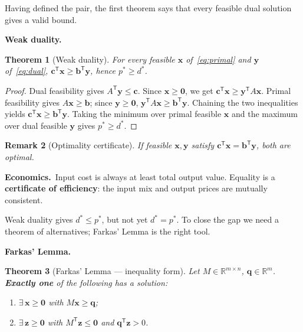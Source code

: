 \documentclass[11pt,a4paper]{article}
\newtheorem{theorem}{Theorem}
\newtheorem{remark}[theorem]{Remark}
\newcommand{\econ}[1]{\medskip\noindent\textbf{Economics.}\ #1\medskip}
\begin{document}
Having defined the pair, the first theorem says that every feasible dual solution gives a valid bound.

\textbf{Weak duality.}

\begin{theorem}[Weak duality]
For every feasible $\mathbf{x}$ of~\eqref{eq:primal} and $\mathbf{y}$ of~\eqref{eq:dual},
$\mathbf{c}^{\mathsf T}\mathbf{x}\ge\mathbf{b}^{\mathsf T}\mathbf{y}$, hence $p^*\ge d^*$.
\end{theorem}

\begin{proof}
Dual feasibility gives $A^{\mathsf T}\mathbf{y}\le\mathbf{c}$.
Since $\mathbf{x}\ge\mathbf{0}$, we get $\mathbf{c}^{\mathsf T}\mathbf{x}\ge\mathbf{y}^{\mathsf T}A\mathbf{x}$.
Primal feasibility gives $A\mathbf{x}\ge\mathbf{b}$; since $\mathbf{y}\ge\mathbf{0}$,
$\mathbf{y}^{\mathsf T}A\mathbf{x}\ge\mathbf{b}^{\mathsf T}\mathbf{y}$.
Chaining the two inequalities yields $\mathbf{c}^{\mathsf T}\mathbf{x}\ge\mathbf{b}^{\mathsf T}\mathbf{y}$.
Taking the minimum over primal feasible $\mathbf{x}$ and the maximum over dual feasible $\mathbf{y}$
gives $p^*\ge d^*$.
\end{proof}

\begin{remark}[Optimality certificate]
If feasible $\mathbf{x},\mathbf{y}$ satisfy $\mathbf{c}^{\mathsf T}\mathbf{x}=\mathbf{b}^{\mathsf T}\mathbf{y}$,
both are optimal.
\end{remark}

\econ{Input cost is always at least total output value.
Equality is a \textbf{certificate of efficiency}: the input mix and output prices are mutually consistent.}

Weak duality gives $d^*\le p^*$, but not yet $d^*=p^*$.
To close the gap we need a theorem of alternatives; Farkas' Lemma is the right tool.

\textbf{Farkas' Lemma.}

\begin{theorem}[Farkas' Lemma --- inequality form]
Let $M\in\mathbb{R}^{m\times n}$, $\mathbf{q}\in\mathbb{R}^m$.
\textbf{Exactly one} of the following has a solution:
\begin{enumerate}[label=(\roman*),nosep]
  \item $\exists\,\mathbf{x}\ge\mathbf{0}$ with $M\mathbf{x}\ge\mathbf{q}$;
  \item $\exists\,\mathbf{z}\ge\mathbf{0}$ with $M^{\mathsf T}\mathbf{z}\le\mathbf{0}$ and $\mathbf{q}^{\mathsf T}\mathbf{z}>0$.
\end{enumerate}
\end{theorem}
\end{document}
